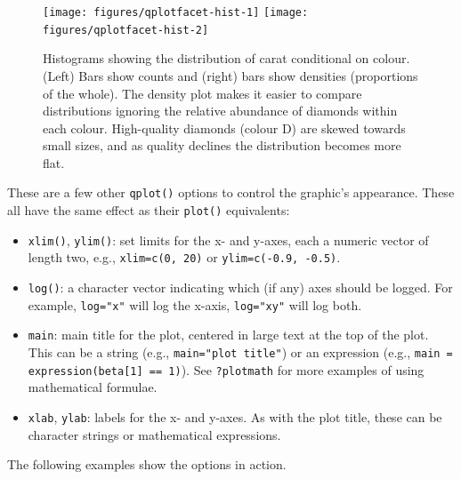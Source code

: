 \begin{figure}
\texttt{[image: figures/qplotfacet-hist-1]} \texttt{[image: figures/qplotfacet-hist-2]} \caption{Histograms showing the distribution of carat conditional on colour.  (Left) Bars show counts and (right) bars show densities (proportions of the whole).  The density plot makes it easier to compare distributions ignoring the relative abundance of diamonds within each colour. High-quality diamonds (colour D) are skewed towards small sizes, and as quality declines the distribution becomes more flat.\label{fig:facet-hist}}
\end{figure}


These are a few other \texttt{qplot()} options to control the graphic's
appearance. These all have the same effect as their \texttt{plot()}
equivalents: 

\begin{itemize}
\itemsep1pt\parskip0pt
\item
  \texttt{xlim()}, \texttt{ylim()}: set limits for the x- and y-axes,
  each a numeric vector of length two, e.g., \texttt{xlim=c(0, 20)} or
  \texttt{ylim=c(-0.9, -0.5)}. 
\item
  \texttt{log()}: a character vector indicating which (if any) axes
  should be logged. For example, \texttt{log="x"} will log the x-axis,
  \texttt{log="xy"} will log both.
\item
  \texttt{main}: main title for the plot, centered in large text at the
  top of the plot. This can be a string (e.g.,
  \texttt{main="plot title"}) or an expression (e.g.,
  \texttt{main = expression(beta{[}1{]} == 1)}). See \texttt{?plotmath}
  for more examples of using mathematical formulae. 
\item
  \texttt{xlab}, \texttt{ylab}: labels for the x- and y-axes. As with
  the plot title, these can be character strings or mathematical
  expressions. 
\end{itemize}

The following examples show the options in action.

\begin{Shaded}
\begin{Highlighting}[]
\NormalTok{>}\StringTok{ }\NormalTok{(}
\NormalTok{+}\StringTok{   } 
\NormalTok{+}\StringTok{   } \NormalTok{, } \NormalTok{,  }
\NormalTok{+}\StringTok{   } 
\NormalTok{+}\StringTok{ }\NormalTok{)}
\end{Highlighting}
\end{Shaded}

